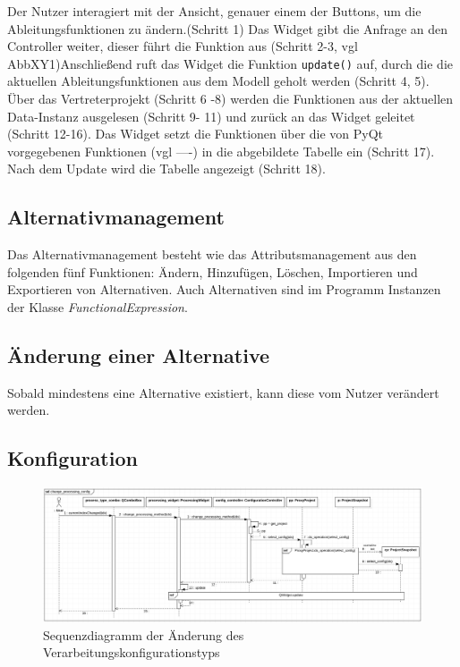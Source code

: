 \documentclass{article}
\begin{document}
\begin{itemize}
Der Nutzer interagiert mit der Ansicht, genauer einem der Buttons, um die Ableitungsfunktionen zu ändern.(Schritt 1) Das Widget gibt die Anfrage an den Controller weiter, dieser führt die Funktion aus (Schritt 2-3, vgl AbbXY1)Anschließend ruft das Widget die Funktion \texttt{update()} auf, durch die die aktuellen Ableitungsfunktionen aus dem Modell geholt werden (Schritt 4, 5). Über das Vertreterprojekt (Schritt 6 -8) werden die Funktionen aus der aktuellen Data-Instanz ausgelesen (Schritt 9- 11) und zurück an das Widget geleitet (Schritt 12-16). Das Widget setzt die Funktionen über die von PyQt vorgegebenen Funktionen (vgl ----) in die abgebildete Tabelle ein (Schritt 17). Nach dem Update wird die Tabelle angezeigt (Schritt 18).



\subsection{Alternativmanagement}
Das Alternativmanagement besteht wie das Attributsmanagement aus den folgenden fünf Funktionen: Ändern, Hinzufügen, Löschen, Importieren und Exportieren von Alternativen. Auch Alternativen sind im Programm Instanzen der Klasse \textit{FunctionalExpression}.
\subsection{Änderung einer Alternative}
Sobald mindestens eine Alternative existiert, kann diese vom Nutzer verändert werden.

\subsection{Konfiguration}
\begin{figure}[H]%
    \centering
    \includegraphics[width=13cm]{entwurf/Entwurf_dokument/img/Michael/sd_change_processing_config.png}
    \caption{Sequenzdiagramm der Änderung des Verarbeitungskonfigurationstyps}
\end{figure}


\end{itemize}
\end{document}
